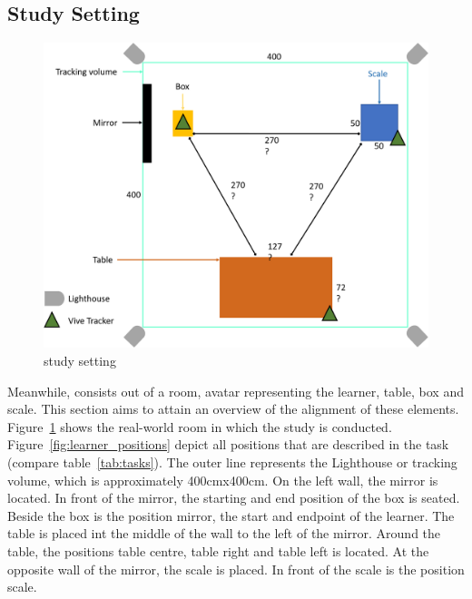 \subsection{Study Setting}
\begin{figure}[H]
	\centering
	\includegraphics[width=\textwidth]{figures/study_setting.png}
	\caption[study setting]{study setting}
	\label{fig:study_setting}
\end{figure}
Meanwhile, \exgo consists out of a room, avatar representing the learner, table, box and scale. This section aims to attain an overview of the alignment of these elements. Figure~\ref{fig:study_setting} shows the real-world room in which the study is conducted. Figure~\ref{fig:learner_positions} depict all positions that are described in the task (compare table~\ref{tab:tasks}). The outer line represents the Lighthouse or tracking volume, which is approximately 400cmx400cm. On the left wall, the mirror is located. In front of the mirror, the starting and end position of the box is seated. Beside the box is the position mirror, the start and endpoint of the learner. The table is placed int the middle of the wall to the left of the mirror. Around the table, the positions table centre, table right and table left is located. At the opposite wall of the mirror, the scale is placed. In front of the scale is the position scale.
